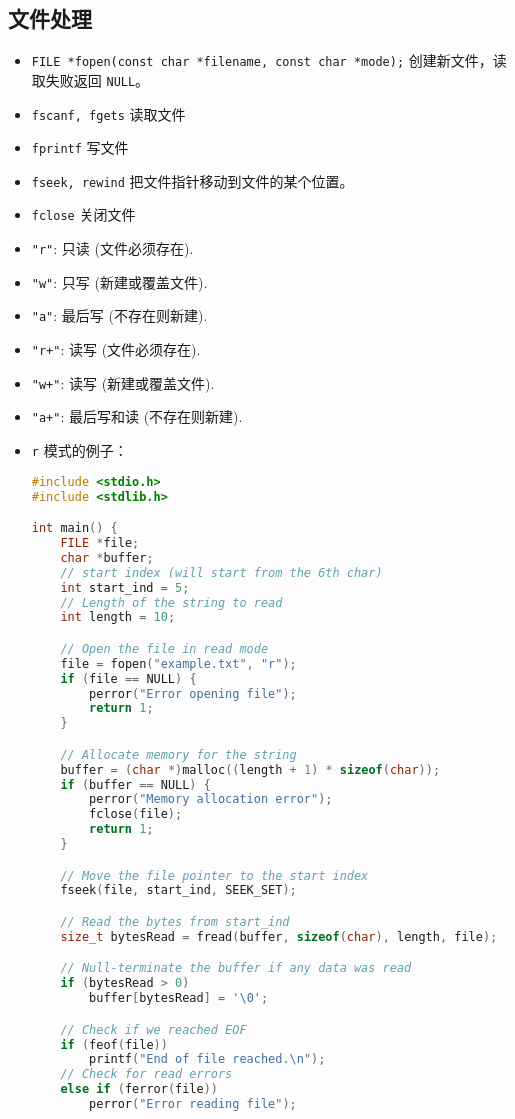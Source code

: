 \subsection{文件处理}
\begin{itemize}
\item \verb`FILE *fopen(const char *filename, const char *mode);` 创建新文件，读取失败返回 \verb`NULL`。
\item \verb`fscanf, fgets` 读取文件
\item \verb`fprintf` 写文件
\item \verb`fseek, rewind` 把文件指针移动到文件的某个位置。
\item \verb`fclose` 关闭文件
\item \verb`"r"`: 只读 (文件必须存在).
\item \verb`"w"`: 只写 (新建或覆盖文件).
\item \verb`"a"`: 最后写 (不存在则新建).
\item \verb`"r+"`: 读写 (文件必须存在).
\item \verb`"w+"`: 读写 (新建或覆盖文件).
\item \verb`"a+"`: 最后写和读 (不存在则新建).
\item \verb`r` 模式的例子：
\begin{lstlisting}[language=cpp]
#include <stdio.h>
#include <stdlib.h>

int main() {
    FILE *file;
    char *buffer;
    // start index (will start from the 6th char)
    int start_ind = 5;
    // Length of the string to read
    int length = 10;

    // Open the file in read mode
    file = fopen("example.txt", "r");
    if (file == NULL) {
        perror("Error opening file");
        return 1;
    }

    // Allocate memory for the string
    buffer = (char *)malloc((length + 1) * sizeof(char));
    if (buffer == NULL) {
        perror("Memory allocation error");
        fclose(file);
        return 1;
    }

    // Move the file pointer to the start index
    fseek(file, start_ind, SEEK_SET);

    // Read the bytes from start_ind
    size_t bytesRead = fread(buffer, sizeof(char), length, file);

    // Null-terminate the buffer if any data was read
    if (bytesRead > 0)
        buffer[bytesRead] = '\0';

    // Check if we reached EOF
    if (feof(file))
        printf("End of file reached.\n");
    // Check for read errors
    else if (ferror(file))
        perror("Error reading file");


\end{lstlisting}
\end{itemize}

